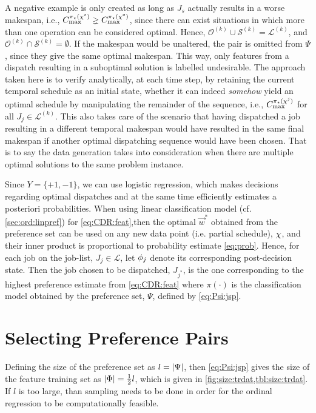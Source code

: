 A negative example is only created as long as $J_s$ actually 
results in a worse makespan, i.e., $C_{\max}^{\pi_\star({\mathbf{\chi}}^s)} \gneq 
C_{\max}^{\pi_\star({\mathbf{\chi}}^o)}$, since there can exist situations in which more 
than one operation can be considered optimal. 
Hence, $\mathcal{O}^{(k)}\cup\mathcal{S}^{(k)}=\mathcal{L}^{(k)}$, and 
$\mathcal{O}^{(k)}\cap\mathcal{S}^{(k)}=\emptyset$.
If the makespan would be unaltered, the pair is omitted from $\Psi$, since they 
give the same optimal makespan. 
This way, only features from a dispatch resulting in a suboptimal solution is 
labelled undesirable.
The approach taken here is to verify analytically, at each time step, by 
retaining the current temporal schedule as an initial state, whether it can 
indeed \emph{somehow} yield an optimal schedule by manipulating the remainder 
of the sequence, i.e., $C_{\max}^{\pi_\star({\mathbf{\chi}}^j)}$ for all 
$J_j\in\mathcal{L}^{(k)}$. 
This also takes care of the scenario that having dispatched a job resulting in 
a different temporal makespan would have resulted in the same final makespan if 
another optimal dispatching sequence would have been chosen. 
That is to say the data generation takes into consideration when there are 
multiple optimal solutions to the same problem instance. 

Since $Y=\{+1,-1\}$, we can use logistic regression, which makes decisions 
regarding optimal dispatches and at the same time efficiently estimates a 
posteriori probabilities. 
When using linear classification model (cf. \cref{sec:ord:linpref}) for 
\cref{eq:CDR:feat},then the optimal $\vec{w}^*$ obtained from the preference 
set can be used on any new data point (i.e. partial schedule), ${\mathbf{\chi}}$, and 
their inner product is proportional to probability estimate \cref{eq:prob}. 
Hence, for each job on the job-list, $J_j\in\mathcal{L}$, let ${\mathbf{\phi}}_j$ denote 
its corresponding post-decision state. Then the job chosen to be dispatched, 
$J_{j^*}$, is the one corresponding to the highest preference estimate
from \cref{eq:CDR:feat} where $\pi(\cdot)$ is the classification model obtained 
by the preference set, $\Psi$, defined by \cref{eq:Psi:jsp}. 

\section{Selecting Preference Pairs}\label{sec:trdat:param}
Defining the size of the preference set as $l=\lvert\Psi\rvert$, then 
\cref{eq:Psi:jsp} gives the size of the feature training set as 
$\lvert\Phi\rvert=\frac{1}{2}l$, which is given in 
\cref{fig:size:trdat,tbl:size:trdat}.
If $l$ is too large, than sampling needs to be done in order for the ordinal 
regression to be computationally feasible.

